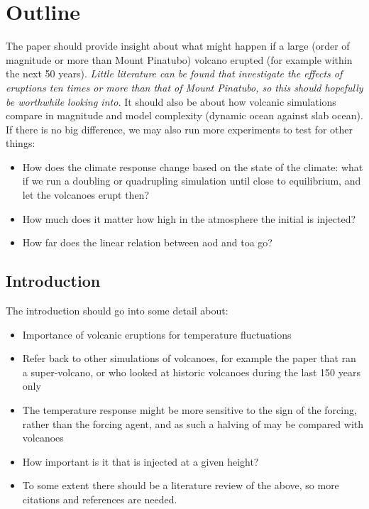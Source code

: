 \documentclass[twocol]{ametsocV5}
\begin{document}
\section{Outline}

The paper should provide insight about what might happen if a large (order of magnitude
or more than Mount Pinatubo) volcano erupted (for example within the next 50 years).
\emph{Little literature can be found that investigate the effects of eruptions ten times
  or more than that of Mount Pinatubo, so this should hopefully be worthwhile looking
  into.} It should also be about how volcanic simulations compare in magnitude and model
complexity (dynamic ocean against slab ocean). If there is no big difference, we may
also run more experiments to test for other things:
\begin{itemize}
  \item How does the climate response change based on the state of the climate: what if we run a
         doubling or quadrupling simulation until close to equilibrium, and let the
        volcanoes erupt then?
  \item How much does it matter how high in the atmosphere the initial  is injected?
  \item How far does the linear relation between \acrshort{aod} and \acrshort{toa} go?
\end{itemize}

\subsection*{Introduction}

The introduction should go into some detail about:

\begin{itemize}
  \item Importance of volcanic eruptions for temperature fluctuations
  \item Refer back to other simulations of volcanoes, for example the \citet{jones2005} paper
        that ran a super-volcano, or \citet{gregory2016} who looked at historic volcanoes during
        the last 150 years only
  \item The temperature response might be more sensitive to the sign of the forcing, rather than
        the forcing agent, and as such a halving of  may be compared with volcanoes
        \citep{gunther2022}
  \item How important is it that  is injected at a given height?
  \item To some extent there should be a literature review of the above, so more citations and
        references are needed.
\end{itemize}
\end{document}
